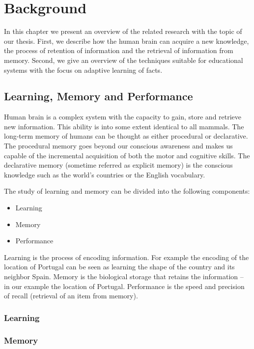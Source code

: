 \chapter{Background}

In this chapter we present an overview of the related research with the topic of our thesis. First, we describe how the human brain can acquire a new knowledge, the process of retention of information and the retrieval of information from memory. Second, we give an overview of the techniques suitable for educational systems with the focus on adaptive learning of facts.

\section{Learning, Memory and Performance}

Human brain is a complex system with the capacity to gain, store and retrieve new information. This ability is into some extent identical to all mammals. The long-term memory of humans can be thought as either procedural or declarative. The procedural memory goes beyond our conscious awareness and makes us capable of the incremental acquisition of both the motor and cognitive skills. The declarative memory (sometime referred as explicit memory) is the conscious knowledge such as the world's countries or the English vocabulary.

The study of learning and memory can be divided into the following components:

\begin{itemize}
  \item Learning
  \item Memory
  \item Performance
\end{itemize}

Learning is the process of encoding information. For example the encoding of the location of Portugal can be seen as learning the shape of the country and its neighbor Spain. Memory is the biological storage that retains the information -- in our example the location of Portugal. Performance is the speed and precision of recall (retrieval of an item from memory).

\subsection{Learning}

\subsection{Memory}
